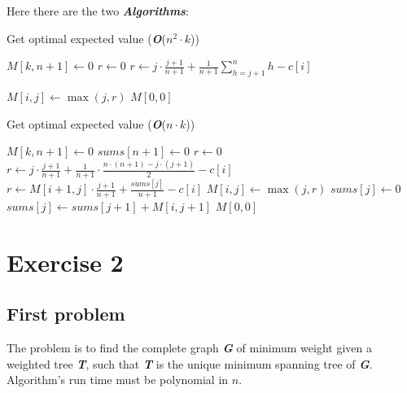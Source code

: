 \documentclass[11pt]{article}
\begin{document}
Here there are the two \textbf{\textit{Algorithms}}:

\begin{minipage}[t]{0.49\textwidth}
\begin{algorithm}[H]
	\caption{Get optimal expected value (\textbf{\textit{O}}($n^2 \cdot k$))}\label{euclid}
	\begin{algorithmic}[1]
		\State $M[k, n+1] \gets 0$
		\State $r \gets 0$
		\State $r \gets j \cdot \frac{j+1}{n+1} + \frac{1}{n+1}\sum\limits_{h = j + 1}^n{h} - c[i]$
		\Else
		\State \begin{varwidth}[t]{\linewidth} $r \gets M[i+1, j] \cdot \frac{j+1}{n+1} + \frac{1}{n+1} \cdot$ \par
			\hskip\algorithmicindent $\sum\limits_{h = j + 1}^n{M[i+1, h]} - c[i]$
		\end{varwidth}
		\EndIf
		\State $M[i, j] \gets \max(j, r)$
		\EndFor		
		\EndFor
		\State \Return $M[0, 0]$
	\end{algorithmic}
\end{algorithm}
\end{minipage}
\hfill
\begin{minipage}[t]{0.49\textwidth}
\begin{algorithm}[H]
	\caption{Get optimal expected value (\textbf{\textit{O}}($n \cdot k$))}\label{euclid}
	\begin{algorithmic}[1]
		\State $M[k, n+1] \gets 0$
		\State $sums[n+1] \gets 0$
		\State $r \gets 0$
			\State $r \gets j \cdot \frac{j+1}{n+1} + \frac{1}{n+1} \cdot \frac{n \cdot (n+1)-j \cdot (j+1)}{2} - c[i]$
		\Else
			\State $r \gets M[i+1, j] \cdot \frac{j+1}{n+1} + \frac{sums[j]}{n+1} - c[i]$
		\EndIf
		\State $M[i, j] \gets \max(j, r)$
			\State $sums[j] \gets 0$
		\Else
			\State $sums[j] \gets sums[j+1] + M[i, j+1]$
		\EndIf
		\EndFor		
		\EndFor
		\State \Return $M[0, 0]$
	\end{algorithmic}
\end{algorithm}
\end{minipage}
\newpage

\section*{Exercise 2}
\subsection*{First problem}
The problem is to find the complete graph \textbf{\textit{G}} of minimum weight given a weighted tree \textbf{\textit{T}}, such that  \textbf{\textit{T}} is the unique minimum spanning tree of \textbf{\textit{G}}. Algorithm's run time must be polynomial in $n$.
\end{document}
